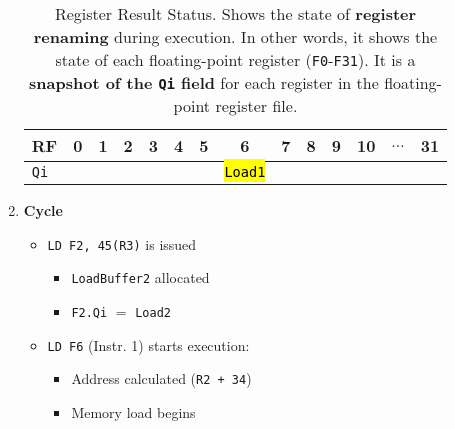 \begin{enumerate}
    \begin{table}[!htp]
        \centering
        \begin{tabular}{@{} l | c c c c c c c c c c c c c @{}}
            \toprule
            RF              & 0             & 1             & 2             & 3             & 4             & 5             & 6                     & 7             & 8             & 9             & 10            & $\dots$           & 31            \\
            \midrule
            \texttt{Qi}     &               &               &               &               &               &               & \hl{\texttt{Load1}}   &               &               &               &               &                   &               \\
            \bottomrule
        \end{tabular}
        \caption*{Register Result Status. Shows the state of \textbf{register renaming} during execution. In other words, it shows the state of each floating-point register (\texttt{F0}-\texttt{F31}). It is a \textbf{snapshot of the \texttt{Qi} field} for each register in the floating-point register file.}
    \end{table}

    \newpage


    \item \textbf{Cycle \theenumi}
    \begin{itemize}
        \item \texttt{LD F2, 45(R3)} is issued
        \begin{itemize}
            \item \texttt{LoadBuffer2} allocated
            \item \texttt{F2.Qi} $=$ \texttt{Load2}
        \end{itemize}
        \item \texttt{LD F6} (Instr. 1) starts execution:
        \begin{itemize}
            \item Address calculated (\texttt{R2 + 34})
            \item Memory load begins
        \end{itemize}
    \end{itemize}


\end{enumerate}
